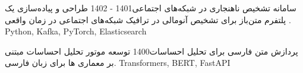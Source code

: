 \begin{projects}
  \project
    {سامانه تشخیص ناهنجاری در شبکه‌های اجتماعی}{1401 - 1402}
    {}
    {طراحی و پیاده‌سازی یک پلتفرم متن‌باز برای تشخیص آنومالی در ترافیک شبکه‌های اجتماعی در زمان واقعی .}
    {Python, Kafka, PyTorch, Elasticsearch}
    
  \project
    {پردازش متن فارسی برای تحلیل احساسات}{1400}
    {}
    {توسعه موتور تحلیل احساسات مبتنی بر معماری ها برای زبان فارسی.}
    {Transformers, BERT, FastAPI}
\end{projects}
